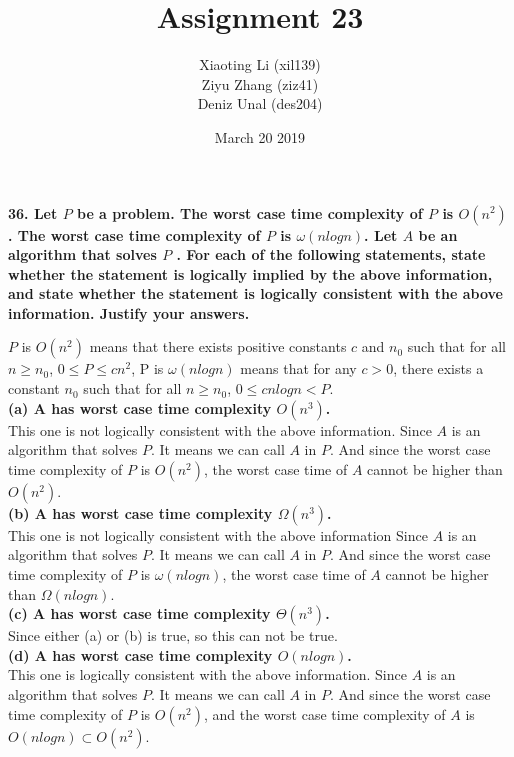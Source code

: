 \documentclass{article}
\title{Assignment 23}
\author{Xiaoting Li (xil139) \\
Ziyu Zhang (ziz41) \\
Deniz Unal (des204)}
\date{March 20 2019}
\begin{document}
\maketitle

\noindent
\textbf{36. Let $P$ be a problem. The worst case time complexity of $P$ is $O(n^2)$. The worst case time complexity of $P$ is $\omega(nlogn)$. Let $A$ be an algorithm that solves $P$ . For each of the following statements, state whether the statement is logically implied by the above information, and state whether the statement is logically consistent with the above information. Justify your answers.} \\ \newline

$P$ is $O(n^2)$ means that there exists positive constants $c$ and $n_0$ such that for all $n\geq n_0$, $0\leq P \leq c n^2$, P is $\omega(nlogn)$ means that for any $c>0$, there exists a constant $n_0$ such that for all $n\geq n_0$, $0\leq c n logn < P$. \\ \newline
\textbf{(a) A has worst case time complexity $O(n^3)$.}\\ \newline
This one is not logically consistent with the above information. Since $A$ is an algorithm that solves $P$. It means we can call $A$ in $P$. And since the worst case time complexity of $P$ is $O(n^2)$, the worst case time of $A$ cannot be higher than $O(n^2)$.\\ \newline
\textbf{(b) A has worst case time complexity $\Omega(n^3)$.} \\ \newline
This one is not logically consistent with the above information Since $A$ is an algorithm that solves $P$. It means we can call $A$ in $P$. And since the worst case time complexity of $P$ is $\omega(nlogn)$, the worst case time of $A$ cannot be higher than $\Omega(nlogn)$.\\ \newline
\textbf{(c) A has worst case time complexity $\Theta(n^3)$.} \\ \newline
Since either (a) or (b) is true, so this can not be true.
\\ \newline
\textbf{(d) A has worst case time complexity $O(nlogn)$.} \\ \newline This one is logically consistent with the above information. Since $A$ is an algorithm that solves $P$. It means we can call $A$ in $P$. And since the worst case time complexity of $P$ is $O(n^2)$, and the worst case time complexity of $A$ is $O(nlogn) \subset O(n^2)$.\\ \newline
\end{document}
